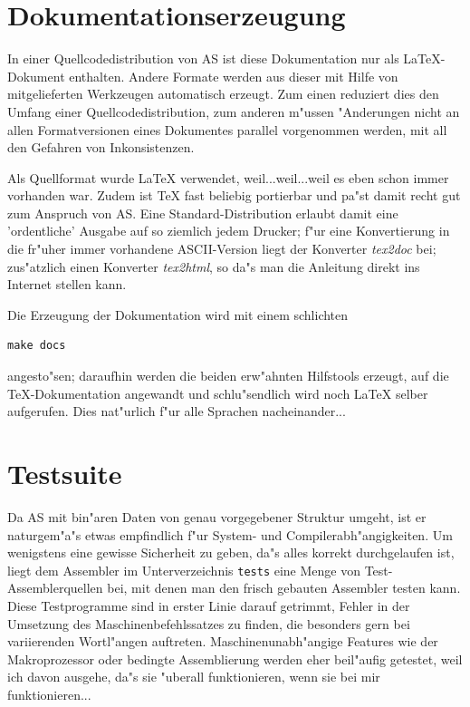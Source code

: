 \documentclass[12pt,a4paper,twoside]{report}
\newcommand{\asname}{AS}
\begin{document}

\section{Dokumentationserzeugung}

In einer Quellcodedistribution von \asname{} ist diese Dokumentation nur als
LaTeX-Dokument enthalten.  Andere Formate werden aus dieser mit Hilfe von
mitgelieferten Werkzeugen automatisch erzeugt.  Zum einen reduziert dies
den Umfang einer Quellcodedistribution, zum anderen m"ussen "Anderungen
nicht an allen Formatversionen eines Dokumentes parallel vorgenommen
werden, mit all den Gefahren von Inkonsistenzen.

Als Quellformat wurde LaTeX verwendet, weil...weil...weil es eben schon
immer vorhanden war.  Zudem ist TeX fast beliebig portierbar und pa"st
damit recht gut zum Anspruch von \asname{}.  Eine Standard-Distribution erlaubt
damit eine 'ordentliche' Ausgabe auf so ziemlich jedem Drucker; f"ur eine
Konvertierung in die fr"uher immer vorhandene ASCII-Version liegt der
Konverter {\em tex2doc} bei; zus"atzlich einen Konverter {\em tex2html},
so da"s man die Anleitung direkt ins Internet stellen kann.

Die Erzeugung der Dokumentation wird mit einem schlichten
\begin{verbatim}
make docs
\end{verbatim}
angesto"sen; daraufhin werden die beiden erw"ahnten Hilfstools erzeugt,
auf die TeX-Dokumentation angewandt und schlu"sendlich wird noch LaTeX
selber aufgerufen.  Dies nat"urlich f"ur alle Sprachen nacheinander...


\section{Testsuite}

Da \asname{} mit bin"aren Daten von genau vorgegebener Struktur umgeht, ist er
naturgem"a"s etwas empfindlich f"ur System- und Compilerabh"angigkeiten.
Um wenigstens eine gewisse Sicherheit zu geben, da"s alles korrekt
durchgelaufen ist, liegt dem Assembler im Unterverzeichnis {\tt tests}
eine Menge von Test-Assemblerquellen bei, mit denen man den frisch
gebauten Assembler testen kann.  Diese Testprogramme sind in erster Linie
darauf getrimmt, Fehler in der Umsetzung des Maschinenbefehlssatzes zu
finden, die besonders gern bei variierenden Wortl"angen auftreten.
Maschinenunabh"angige Features wie der Makroprozessor oder bedingte
Assemblierung werden eher beil"aufig getestet, weil ich davon ausgehe,
da"s sie "uberall funktionieren, wenn sie bei mir funktionieren...
\end{document}
